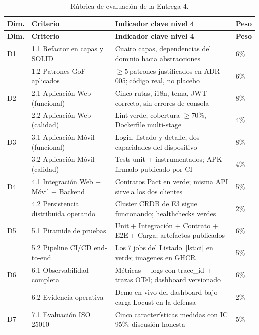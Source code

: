 \documentclass[11pt,a4paper]{article}
\begin{document}
    \renewcommand{\arraystretch}{1.2}
    \small
    \begin{xltabular}{\linewidth}{@{}p{0.9cm} p{4.6cm} X p{1cm}@{}}
        \caption{Rúbrica de evaluación de la Entrega 4.}
        \label{tab:rúbrica-e4}\\
        \toprule
        \textbf{Dim.} & \textbf{Criterio} & \textbf{Indicador clave nivel 4} & \textbf{Peso}\\
        \midrule
        \endfirsthead
        \toprule
        \textbf{Dim.} & \textbf{Criterio} & \textbf{Indicador clave nivel 4} & \textbf{Peso}\\
        \midrule
        \endhead
        \bottomrule
        \endfoot
        D1 & 1.1 Refactor en capas y SOLID & Cuatro capas, dependencias del dominio hacia abstracciones & 6\%\\
           & 1.2 Patrones GoF aplicados & $\ge 5$ patrones justificados en ADR-005; código real, no placebo & 6\%\\
        D2 & 2.1 Aplicación Web (funcional) & Cinco rutas, i18n, tema, JWT correcto, sin errores de consola & 8\%\\
           & 2.2 Aplicación Web (calidad) & Lint verde, cobertura $\ge 70\%$, Dockerfile multi-stage & 4\%\\
        D3 & 3.1 Aplicación Móvil (funcional) & Login, listado y detalle, dos capacidades del dispositivo & 8\%\\
           & 3.2 Aplicación Móvil (calidad) & Tests unit + instrumentados; APK firmado publicado por CI & 4\%\\
        D4 & 4.1 Integración Web + Móvil + Backend & Contratos Pact en verde; misma API sirve a los dos clientes & 5\%\\
           & 4.2 Persistencia distribuida operando & Cluster CRDB de E3 sigue funcionando; healthchecks verdes & 2\%\\
        D5 & 5.1 Piramide de pruebas & Unit + Integración + Contrato + E2E + Carga; artefactos publicados & 6\%\\
           & 5.2 Pipeline CI/CD end-to-end & Los 7 jobs del Listado~\ref{lst:ci} en verde; imagenes en GHCR & 5\%\\
        D6 & 6.1 Observabilidad completa & Métricas + logs con trace\_id + trazas OTel; dashboard versionado & 6\%\\
           & 6.2 Evidencia operativa & Demo en vivo del dashboard bajo carga Locust en la defensa & 2\%\\
        D7 & 7.1 Evaluación ISO 25010 & Cinco características medidas con IC 95\%; discusión honesta & 5\%\\

\end{xltabular}
\end{document}
